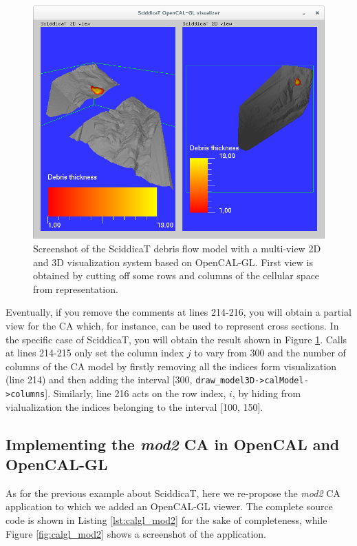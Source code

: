 \begin{figure}
  \begin{center}
    \includegraphics[width=12cm]{./images/OpenCAL/calgl_sciddicaT3}
    \caption{Screenshot of the SciddicaT debris flow model with a
      multi-view 2D and 3D visualization system based on
      OpenCAL-GL. First view is obtained by cutting off some rows and
      columns of the cellular space from representation.}
    \label{fig:calgl_sciddicaT3}
  \end{center}
\end{figure}

Eventually, if you remove the comments at lines 214-216, you will
obtain a partial view for the CA which, for instance, can be used to
represent cross sections. In the specific case of SciddicaT, you will
obtain the result shown in Figure \ref{fig:calgl_sciddicaT3}. Calls at
lines 214-215 only set the column index $j$ to vary from 300 and the
number of columns of the CA model by firstly removing all the indices
form visualization (line 214) and then adding the interval [300,
  \verb'draw_model3D->calModel->columns']. Similarly, line 216 acts on
the row index, $i$, by hiding from vialualization the indices
belonging to the interval [100, 150].

\subsection{Implementing the \emph{mod2} CA in OpenCAL and OpenCAL-GL}

As for the previous example about SciddicaT, here we re-propose the
\emph{mod2} CA application to which we added an OpenCAL-GL viewer. The
complete source code is shown in Listing \ref{lst:calgl_mod2} for the
sake of completeness, while Figure \ref{fig:calgl_mod2} shows a
screenshot of the application.

